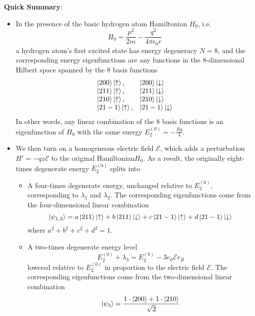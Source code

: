 \documentclass[11pt, a4paper]{article}
\newcommand{\Ham}{Hamiltonian\xspace}
\newcommand{\p}{\psi}  %
\newcommand{\E}{\mathcal{E}}  %
\newcommand{\ua}{\uparrow}  %
\newcommand{\da}{\downarrow}  %
\begin{document}
	
\textbf{Quick Summary}: 
\begin{itemize}
	\item In the presence of the basic hydrogen atom Hamiltonian $ H_{0} $, i.e.
	\begin{equation*}
		H_{0} = \frac{p^{2}}{2m} - \frac{q^{2}}{4\pi \epsilon_{0}r}
	\end{equation*}
	a hydrogen atom's first excited state has energy degeneracy $ N = 8 $, and the corresponding energy eigenfunctions are any functions in the  $ 8 $-dimensional Hilbert space spanned by the 8 basis functions
	\[
	\begin{array}{ll}
		\ket{200}\ket{\ua}, & \ket{200}\ket{\da}\\
		\ket{211}\ket{\ua}, & \ket{211}\ket{\da}\\
		\ket{210}\ket{\ua}, & \ket{210}\ket{\da}\\
		\ket{21-1}\ket{\ua}, & \ket{21-1}\ket{\da}
	\end{array}
	\]
	In other words, any linear combination of the 8 basis functions is an eigenfunction of $ H_{0} $ with the  same energy $ E^{(0)}_{2} = -\frac{\si{Ry}}{4} $.
	
	\item We then turn on a homogeneous electric field $ \E $, which adds a perturbation $ H' = -qz\E $ to the original \Ham $ H_{0} $. As a result, the originally eight-times degenerate energy $ E^{(0)}_{2} $ splits into
	\begin{itemize}
		\item  A four-times degenerate energy, unchanged relative to $ E^{(0)}_{2} $, corresponding to $ \lambda_{1} $ and $ \lambda_{2} $. The corresponding eigenfunctions come from the four-dimensional linear combination 
		\begin{equation*}
			\ket{\p_{1,2}} = a \ket{211}\ket{\ua} + b \ket{211}\ket{\da} + c \ket{21-1}\ket{\ua} + d \ket{21-1}\ket{\da}
		\end{equation*}
		where $ a^{2} + b^{2} + c^{2} + d^{2} = 1 $. 
		
		\item A two-times degenerate energy level
		\begin{equation*}
			E^{(0)}_{2} + \lambda_{3} = E^{(0)}_{2} - 3 e_{0}\E r_{B}
		\end{equation*}
		lowered relative to $ E^{(0)}_{2} $ in proportion to the electric field $ \E $. The corresponding eigenfunctions come from the two-dimensional linear combination
		\begin{equation*}
			\ket{\p_{3}} = \frac{1\cdot \ket{200} + 1\cdot \ket{210}}{\sqrt{2}}
		\end{equation*}
			

\end{itemize}
\end{itemize}
\end{document}

